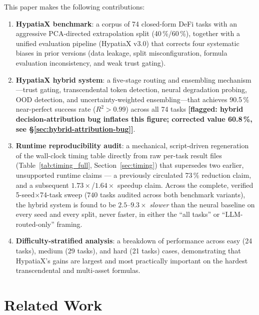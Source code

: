 \documentclass[twoside,11pt]{article}
\newcommand{\Rsq}{R^{2}}
\begin{document}
This paper makes the following contributions:

\begin{enumerate}[leftmargin=2em,label=(\roman*)]
  \item \textbf{HypatiaX benchmark}: a corpus of 74 closed-form DeFi tasks
    with an aggressive PCA-directed extrapolation split (40\,\%/60\,\%), together
    with a unified evaluation pipeline (HypatiaX v3.0) that corrects four
    systematic biases in prior versions (data leakage, split misconfiguration,
    formula evaluation inconsistency, and weak trust gating).

  \item \textbf{HypatiaX hybrid system}: a five-stage routing and ensembling
    mechanism---trust gating, transcendental token detection, neural degradation
    probing, OOD detection, and uncertainty-weighted ensembling---that achieves
    90.5\,\% near-perfect success rate ($\Rsq>0.99$) across all 74 tasks
    \textbf{[flagged: hybrid decision-attribution bug inflates this figure;
    corrected value 60.8\,\%, see \S\ref{sec:hybrid-attribution-bug}]}.

  \item \textbf{Runtime reproducibility audit}: a mechanical, script-driven
    regeneration of the wall-clock timing table directly from raw per-task
    result files (Table~\ref{tab:timing_full}, Section~\ref{sec:timing})
    that supersedes two earlier, unsupported runtime claims --- a
    previously circulated 73\,\% reduction claim, and a subsequent
    $1.73\times$/$1.64\times$ speedup claim. Across the complete, verified
    5-seed$\times$74-task sweep ($740$ tasks audited across both benchmark
    variants), the hybrid system is found to be $2.5$--$9.3\times$
    \emph{slower} than the neural baseline on every seed and every split,
    never faster, in either the ``all tasks'' or ``LLM-routed-only''
    framing.

  \item \textbf{Difficulty-stratified analysis}: a breakdown of performance across
    easy (24 tasks), medium (29 tasks), and hard (21 tasks) cases, demonstrating
    that HypatiaX's gains are largest and most practically important on the hardest
    transcendental and multi-asset formulas.
\end{enumerate}

\section{Related Work}
\label{sec:related}
\end{document}
